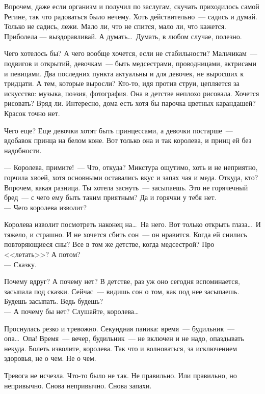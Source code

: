 Впрочем, даже если организм и получил по заслугам, скучать приходилось самой 
Регине, так что радоваться было нечему. Хоть действительно~--- садись и думай. 
Только не садись, лежи. Мало ли, что не спится, мало ли, что кажется. Приболела 
--- выздоравливай. А думать\ldots\ Думать, в любом случае, полезно.

Чего хотелось бы? А чего вообще хочется, если не стабильности? Мальчикам~--- 
подвигов и открытий, девочкам~--- быть медсестрами, проводницами, актрисами и 
певицами. Два последних пункта актуальны и для девочек, не выросших к тридцати. 
А тем, которые выросли? Кто-то, идя против струи, цепляется за искусство: 
музыка, поэзия, фотография. Она в детстве неплохо рисовала. Хочется рисовать? 
Вряд ли. Интересно, дома есть хотя бы парочка цветных карандашей? Красок точно 
нет.

Чего еще? Еще девочки хотят быть принцессами, а девочки постарше~--- вдобавок 
принца на белом коне. Вот только она и так королева, и принц ей без надобности.

\noindent --- Королева, примите!~--- Что, откуда? Микстура ощутимо, хоть и не 
неприятно, горчила хвоей, хотя основными оставались вкус и запах чая и меда. 
Откуда, кто? Впрочем, какая разница. Ты хотела заснуть~--- засыпаешь. Это не 
горячечный бред~--- с чего ему быть таким приятным? Да и горячки у тебя нет.\\
--- Чего королева изволит?

Королева изволит посмотреть наконец на\ldots\ На него. Вот только открыть 
глаза\ldots\ И тяжело, и страшно. И не хочется сбить сон~--- он нравится. Когда 
ей снились повторяющиеся сны? Все в том же детстве, когда медсестрой? Про 
<<летать>>? А 
потом?\\
--- Сказку.

Почему вдруг? А почему нет? В детстве, раз уж оно сегодня вспоминается, засыпала 
под сказки. Сейчас~--- видишь сон о том, как под нее засыпаешь. Будешь 
засыпать. 
Ведь будешь?\\
--- А почему бы нет? Слушайте, королева\ldots

Проснулась резко и тревожно. Секундная паника: время~--- будильник~--- 
опа\ldots\ Опа! Время~--- вечер, будильник~--- не включен и не надо, опаздывать 
некуда. Болеть 
изволите, королева. Так что и волноваться, за исключением здоровья, не о чем. Не 
о чем.

Тревога не исчезла. Что-то было не так. Не правильно. Или правильно, но 
непривычно. Снова непривычно. Снова запахи.

